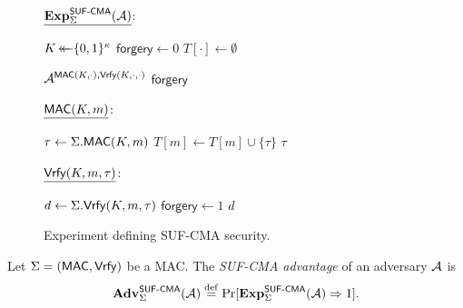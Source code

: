 \begin{figure}



\begin{adjustbox}{margin*=2ex,frame,center}
	\begin{minipage}[t]{0.4\textwidth}
			$\underline{\mathbf{Exp}_{\Sigma}^{\operatorname{\mathsf{SUF-CMA}}}(\mathcal{A})}$: 
			\begin{algorithmic}[1]
				\State $K \operatorname{\leftarrow\mathrel{\mkern-14mu}\leftarrow} \lbrace 0, 1 \rbrace^\kappa$
				\State $\mathsf{forgery} \gets 0$
				\State $T[\cdot] \gets \emptyset$
				
				\State
				\State $\mathcal{A}^{\mathsf{MAC}(K, \cdot),\mathsf{Vrfy}(K, \cdot, \cdot)}$ 
				\State \Return $\mathsf{forgery}$
		
	
			\end{algorithmic}
	\end{minipage}
	
	\begin{minipage}[t]{0.4\textwidth}		
			
			$\underline{\mathsf{MAC}(K, m)}$: 
			\begin{algorithmic}[1]
				\State $\tau \gets \Sigma.\mathsf{MAC}(K, m)$
				\State $T[m] \gets T[m] \cup \lbrace \tau \rbrace$
				\State \Return $\tau$
		
	
			\end{algorithmic}
			
			\vspace{1em}
			
			$\underline{\mathsf{Vrfy}(K, m, \tau)}$: 
			\begin{algorithmic}[1]
				\State $d \gets \Sigma.\mathsf{Vrfy}(K, m, \tau)$
					\State $\mathsf{forgery} \gets 1$
				\EndIf
				\State \Return $d$
			\end{algorithmic}
	\end{minipage}

\end{adjustbox}

\caption{Experiment defining SUF-CMA security.}
\label{fig:MAC_security_experiment}

\end{figure}

\begin{definition}
Let $\Sigma = (\mathsf{MAC}, \mathsf{Vrfy})$ be a MAC. 
The \emph{SUF-CMA advantage} of an adversary $\mathcal{A}$ is 
\begin{equation}
	\mathbf{Adv}_{\Sigma}^{\operatorname{\mathsf{SUF-CMA}}}(\mathcal{A}) \overset{\mathrm{def}}{=} \Pr[\mathbf{Exp}_{\Sigma}^{\operatorname{\mathsf{SUF-CMA}}}(\mathcal{A}) \Rightarrow 1] .
\end{equation}
\end{definition}



